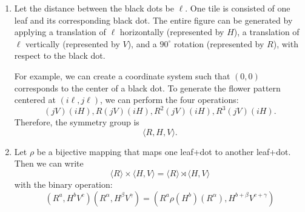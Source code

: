 \begin{sol}
\begin{enumerate}[label=(\alph*)]
    \item Let the distance between the black dots be $\ell$. One tile is consisted of one leaf and its corresponding black dot. The entire figure can be generated by applying a translation of $\ell$ horizontally (represented by $H$), a translation of $\ell$ vertically (represented by $V$), and a $90^\circ$ rotation (represented by $R$), with respect to the black dot.
    
    For example, we can create a coordinate system such that $(0,0)$ corresponds to the center of a black dot. To generate the flower pattern centered at $(i\ell, j\ell)$, we can perform the four operations:
    \begin{equation*}
        (jV)(iH),
        R(jV)(iH),
        R^2(jV)(iH),
        R^3(jV)(iH).
    \end{equation*}
    Therefore, the symmetry group is
    $$
    \langle R, H, V\rangle.
    $$
    \item Let $\rho$ be a bijective mapping that maps one leaf+dot to another leaf+dot. Then we can write
    $$
        \langle R\rangle \times \langle H,V \rangle = \langle R\rangle \rtimes \langle H,V\rangle
    $$
    with the binary operation:
    \begin{equation}
        (R^a, H^bV^c)(R^\alpha, H^\beta V^\gamma) = (R^a \rho(H^b)(R^\alpha), H^{b+\beta}V^{c+\gamma})
    \end{equation}
\end{enumerate}
\end{sol}